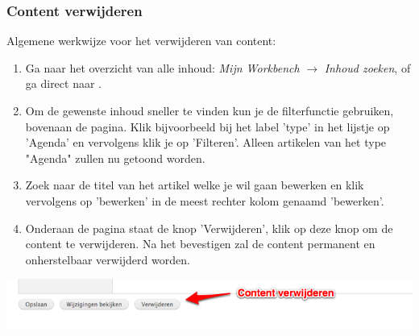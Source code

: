 \subsubsection{Content verwijderen}\label{contentverwijderen}
Algemene werkwijze voor het verwijderen van content:
\begin{enumerate}
\item Ga naar het overzicht van alle inhoud: \emph{Mijn Workbench} $\rightarrow$ \emph{Inhoud zoeken}, of ga direct naar .
\item Om de gewenste inhoud sneller te vinden kun je de filterfunctie gebruiken, bovenaan de pagina. Klik bijvoorbeeld bij het label 'type' in het lijstje op 'Agenda' en vervolgens klik je op 'Filteren'. Alleen artikelen van het type "Agenda" zullen nu getoond worden.
\item Zoek naar de titel van het artikel welke je wil gaan bewerken en klik vervolgens op 'bewerken' in de meest rechter kolom genaamd 'bewerken'.
\item Onderaan de pagina staat de knop 'Verwijderen', klik op deze knop om de content te verwijderen. Na het bevestigen zal de content permanent en onherstelbaar verwijderd worden.
\end{enumerate}

\bigskip

\begin{center}
	\includegraphics[width=\textwidth]{img/content3.png}
\end{center}